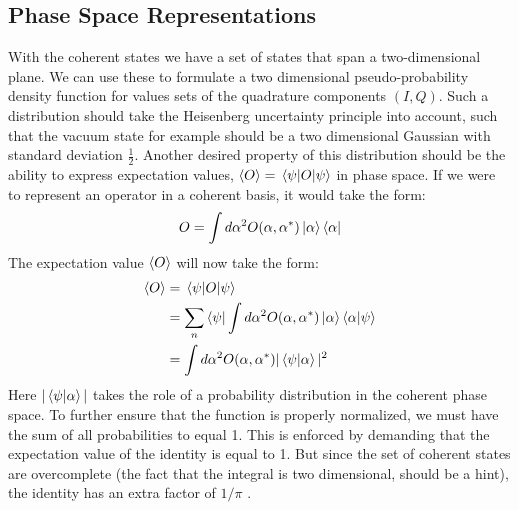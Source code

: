 
\subsection{Phase Space Representations}
With the coherent states we have a set of states that span a two-dimensional plane. We can use these to formulate a two dimensional pseudo-probability density function for values sets of the quadrature components $(I, Q)$. Such a distribution should take the Heisenberg uncertainty principle into account, such that the vacuum state for example should be a two dimensional Gaussian with standard deviation $\frac12$. Another desired property of this distribution should be the ability to express expectation values, $\expval{O} = \mel{\psi}{O}{\psi}$ in phase space. If we were to represent an operator in a coherent basis, it would take the form:
\begin{equation}
    O = \int d\alpha^2 O(\alpha, \alpha^*)\ket{\alpha}\bra{\alpha} 
\end{equation}
The expectation value $\expval{O}$ will now take the form: 
\begin{align*}
    \expval{O} &= \mel{\psi}{O}{\psi} \\
               &= \sum_n \bra{\psi} \int d\alpha^2 O(\alpha, \alpha^*)\ket{\alpha}\bra{\alpha} \ket{\psi}\\
               &= \int d\alpha^2 O(\alpha, \alpha^*) |\braket{\psi}{\alpha}|^2
\end{align*}
Here $|\braket{\psi}{\alpha}|$ takes the role of a probability distribution in the coherent phase space. To further ensure that the function is properly normalized, we must have the sum of all probabilities to equal 1. This is enforced by demanding that the expectation value of the identity is equal to 1. But since the set of coherent states are overcomplete (the fact that the integral is two dimensional, should be a hint), the identity has an extra factor of $1 / \pi$ \cite{gerry_introductory_2004}. 

